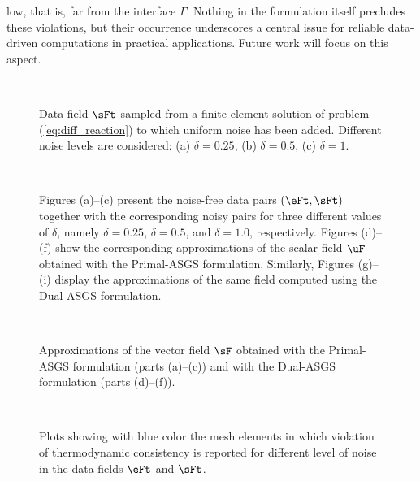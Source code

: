 low, that is, far from the interface $\Gamma$. Nothing in the formulation itself precludes 
these violations, but their occurrence underscores a central issue for reliable data-driven
computations in practical applications. Future work will focus on this aspect.
\begin{figure}[ht!!]
	\centering
	\caption{Data field $\sFt$ sampled from a finite element solution of problem
		(\ref{eq:diff_reaction}) to which uniform noise has been added. Different noise levels are considered: (a) $\delta=0.25$, (b) $\delta=0.5$, (c) $\delta=1$.}
	~\\
	\fontsize{12pt}{10pt}\selectfont 
	\def\svgwidth{1.0\columnwidth}
	
	\label{fig:st_with_noise}
\end{figure}

\begin{figure}[h!]
	\centering
	\caption{Figures (a)--(c) present the noise-free data pairs $(\eFt,\sFt)$ together with the corresponding noisy pairs for three different values of $\delta$, namely $\delta = 0.25$, $\delta = 0.5$, and $\delta = 1.0$, respectively. Figures (d)--(f) show the corresponding approximations of the scalar field $\uF$ obtained with the Primal-ASGS formulation. Similarly, Figures (g)--(i) display the approximations of the same field computed using the Dual-ASGS formulation.}
	~\\
	\def\svgwidth{1.0\columnwidth}
	
	\label{fig:noise_graph_and_u}
\end{figure}

\begin{figure}[h!]
	\centering
	\caption{Approximations of the vector field $\sF$ obtained with the Primal-ASGS formulation (parts (a)--(c)) and with the Dual-ASGS formulation (parts (d)--(f)).}
	~\\
	\def\svgwidth{1.0\columnwidth}
	
	\label{fig:noise_s}
\end{figure}

\begin{figure}[h!]
	\centering
	\caption{Plots showing with blue color the mesh elements in which violation of thermodynamic consistency is reported for different level of noise in the data fields $\eFt$ and $\sFt$.}
	~\\
	\def\svgwidth{1.0\columnwidth}
	
	\label{fig:noise_s_dot_e}
\end{figure}



